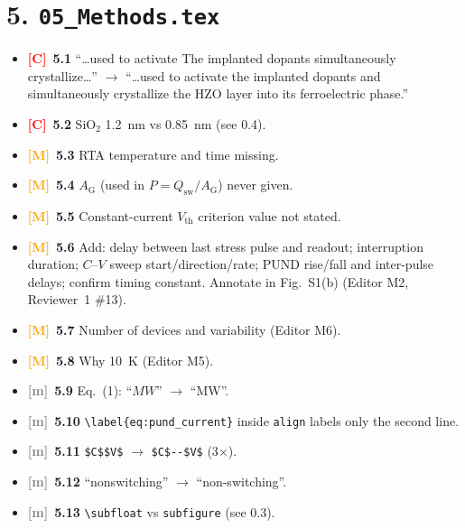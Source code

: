 \documentclass[10pt,a4paper]{article}
\newcommand{\C}{\textcolor{red}{\textbf{[C]}}}
\newcommand{\M}{\textcolor{orange}{\textbf{[M]}}}
\newcommand{\m}{\textcolor{gray}{\textbf{[m]}}}
\begin{document}
\section*{5. \texttt{05\_Methods.tex}}
\begin{itemize}
\item \C\ \textbf{5.1} ``\ldots used to activate The implanted dopants simultaneously crystallize\ldots'' $\rightarrow$ ``\ldots used to activate the implanted dopants and simultaneously crystallize the HZO layer into its ferroelectric phase.''
\item \C\ \textbf{5.2} SiO$_2$ 1.2~nm vs 0.85~nm (see 0.4).
\item \M\ \textbf{5.3} RTA temperature and time missing.
\item \M\ \textbf{5.4} $A_{\mathrm G}$ (used in $P=Q_{\mathrm{sw}}/A_{\mathrm G}$) never given.
\item \M\ \textbf{5.5} Constant-current $V_{\mathrm{th}}$ criterion value not stated.
\item \M\ \textbf{5.6} Add: delay between last stress pulse and readout; interruption duration; $C$--$V$ sweep start/direction/rate; PUND rise/fall and inter-pulse delays; confirm timing constant. Annotate in Fig.~S1(b) (Editor M2, Reviewer~1 \#13).
\item \M\ \textbf{5.7} Number of devices and variability (Editor M6).
\item \M\ \textbf{5.8} Why 10~K (Editor M5).
\item \m\ \textbf{5.9} Eq.~(1): ``$MW$'' $\rightarrow$ ``$\mathrm{MW}$''.
\item \m\ \textbf{5.10} \verb|\label{eq:pund_current}| inside \texttt{align} labels only the second line.
\item \m\ \textbf{5.11} \verb|$C$$V$| $\rightarrow$ \verb|$C$--$V$| (3$\times$).
\item \m\ \textbf{5.12} ``nonswitching'' $\rightarrow$ ``non-switching''.
\item \m\ \textbf{5.13} \verb|\subfloat| vs \texttt{subfigure} (see 0.3).
\end{itemize}

\end{document}

